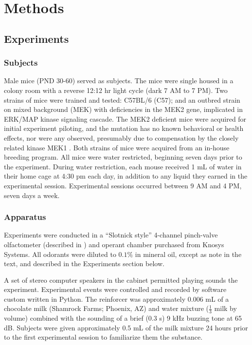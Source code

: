 \section*{Methods}
\label{sec:methods}
\subsection*{Experiments}

\subsubsection*{Subjects}
\label{sec:methods_subjects}
Male mice (PND 30-60) served as subjects. The mice were single housed in a colony room with a reverse 12:12 hr light cycle (dark 7 AM to 7 PM). Two strains of mice were trained and tested: C57BL/6 (C57); and an outbred strain on mixed background (MEK) with deficiencies in the MEK2 gene, implicated in ERK/MAP kinase signaling cascade. The MEK2 deficient mice were acquired for initial experiment piloting, and the mutation has no known behavioral or health effects, nor were any observed, presumably due to compensation by the closely related kinase MEK1 \cite{12832465}. Both strains of mice were acquired from an in-house breeding program. All mice were water restricted, beginning seven days prior to the experiment. During water restriction, each mouse received 1 mL of water in their home cage at 4:30 pm each day, in addition to any liquid they earned in the experimental session. Experimental sessions occurred between 9 AM and 4 PM, seven days a week.

\subsubsection*{Apparatus}
\label{sec:methods_apparatus}
Experiments were conducted in a ``Slotnick style'' 4-channel pinch-valve olfactometer (described in \cite{18428626}) and operant chamber purchased from Knosys Systems. All odorants were diluted to $0.1\%$ in mineral oil, except as note in the text, and described in the Experiments section below.

A set of stereo computer speakers in the cabinet permitted playing sounds the experiment.  Experimental events were controlled and recorded by software custom written in Python. The reinforcer was approximately 0.006 mL of a chocolate milk (Shamrock Farms; Phoenix, AZ) and water mixture ($\frac{1}{3}$ milk by volume) combined with the sounding of a brief (0.3 s) 9 kHz buzzing tone at 65 dB. Subjects were given approximately 0.5 mL of the milk mixture 24 hours prior to the first experimental session to familiarize them the substance.  

